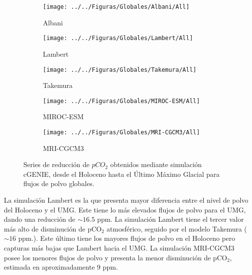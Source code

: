 \begin{figure}[H]
        \begin{subfigure}[b]{0.5\textwidth}
                \texttt{[image: ../../Figuras/Globales/Albani/All]}
                \caption{Albani}
                \label{fig:A_All}
        \end{subfigure}%
                \begin{subfigure}[b]{0.5\textwidth}
                \texttt{[image: ../../Figuras/Globales/Lambert/All]}
                \caption{Lambert}
                \label{fig:L_All}
        \end{subfigure}%

        \begin{subfigure}[b]{0.5\textwidth}
                \texttt{[image: ../../Figuras/Globales/Takemura/All]}
                \caption{Takemura}
                \label{fig:T-All}
        \end{subfigure}%
        \begin{subfigure}[b]{0.5\textwidth}
                \texttt{[image: ../../Figuras/Globales/MIROC-ESM/All]}
                \caption{MIROC-ESM}
                \label{fig:MI-All}
        \end{subfigure}
        
        \begin{subfigure}[b]{0.5\textwidth}
                \texttt{[image: ../../Figuras/Globales/MRI-CGCM3/All]}
                \caption{MRI-CGCM3}
                \label{fig:MR-All}
        \end{subfigure}
        \caption[Series de reducci\'on de $pCO_2$ de flujos globales de polvo]{Series de reducci\'on de $pCO_2$ obtenidos mediante simulaci\'on cGENIE, desde el Holoceno hasta el \'Ultimo M\'aximo Glacial para flujos de polvo globales.}\label{fig:All}
\end{figure}

 La simulación Lambert es la que presenta mayor diferencia entre el nivel de polvo del Holoceno y el UMG. Este tiene lo más elevados flujos de polvo para el UMG, dando una reducción de $\sim 16.5$ ppm. La simulación Lambert tiene el tercer valor más alto de disminución de pCO$_2$ atmosférico, seguido por el modelo Takemura ($\sim 16$ ppm.). Este último tiene los mayores flujos de polvo en el Holoceno pero capturas más bajas que Lambert hacia el UMG. La simulación MRI-CGCM3 posee los menores flujos de polvo y presenta la menor disminución de pCO$_2$, estimada en aproximadamente 9 ppm. \newpage

